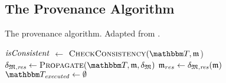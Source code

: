 \subsection{The Provenance Algorithm}

\begin{algorithm}
	\caption[Provenance application algorithm]{The provenance algorithm. Adapted from \cite{gleitze2020orchestration}.}
	\label{algo:orchestration:provenance}
	

    \begin{algorithmic}[1]
        \State $\mathit{isConsistent}$ $\leftarrow$ $\function{CheckConsistency}(\transformationset{T}, \modeltuple{m}$)
            \State \Return{$\bot$} \label{algo:orchestration:provenance:line:bot_input}
        \EndIf
        \State $\changetuple{\metamodeltuple{M},\mathvariable{res}} \gets %
        \function{Propagate}(\transformationset{T}, \modeltuple{m}, \changetuple{\metamodeltuple{M}})$
            \State \Return{$\bot$} \label{algo:orchestration:provenance:line:bot_orchestration}
        \EndIf
        \State $\mathfrak{m}_{res} \leftarrow \mathfrak{\delta}_{\mathfrak{M},\mathit{res}}(\mathfrak{m})$
        \State {} \label{algo:orchestration:provenance:line:return_result}
    \EndProcedure
    \vspace{\baselineskip}
        \vspace{0.15\baselineskip}
        \State $\provalgexecuted \gets \emptyset$ \label{algo:orchestration:provenance:line:executed_init}
        \vspace{0.3\baselineskip}
        

\end{algorithmic}
\end{algorithm}
